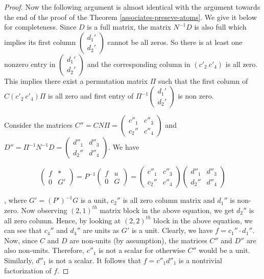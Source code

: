 \begin{proof}
%
%
%

Now the following argument is almost identical with the argument towards the end of the proof of the Theorem \ref{associates-preseve-atoms}. We give it below for completeness. 
Since $D$ is a full matrix, the matrix $N^{-1}D$ is also full which
implies its first column $\left(\begin{array}{c} d_1'\\ d_2' \end{array} \right)$ cannot be all zeros. So there is at least one nonzero entry in $\left(\begin{array}{c} d_1'\\ d_2' \end{array} \right)$ and the corresponding column in $(c'_2~c'_4)$ is all zero. This implies there exist a permutation matrix $\Pi$ such that the first column of $C(c'_2~c'_4)\Pi$ is all zero and first entry of $\Pi^{-1} \left(\begin{array}{c} d_1'\\ d_2' \end{array} \right)$ is non zero.

%
%
%
%
%
%
%
%
%
%
%
%
%

Consider the matrices $C''=CN\Pi=\left(
\begin{array}{cc}
c''_1 & c''_3 \\
c_2'' & c''_4
\end{array}
\right)
$ and
$D''=\Pi^{-1}N^{-1}D=\left(
\begin{array}{cc}
d''_1 & d''_3 \\
d_2'' & d''_4
\end{array}
\right)
$. We have

\[  \left(
\begin{array}{cc}
f & * \\
0 & G'
\end{array}
\right)
=P^{-1}
\left(
\begin{array}{cc}
f & u \\
0 & G
\end{array}
\right)
=
\left(
\begin{array}{cc}
c''_1 & c''_3 \\
c_2'' & c''_4
\end{array}
\right)
  \left(
\begin{array}{cc}
d''_1 & d''_3\\
d_2'' & d''_4
\end{array}
\right)
\]

, where $G'=(P')^{-1}G$ is a unit, $c_2''$ is all zero column matrix and $d_1''$ is non-zero. Now observing $(2,1)^{th}$ matrix block in the above equation, we get $d_2''$ is all zero column. Hence, by looking at $(2,2)^{th}$ block in the above equation, we can see that $c_4''$ and $d_4''$ are units as $G'$ is a unit. Clearly, we have $f= c_1'' \cdot d_1 ''$. Now,
since $C$ and $D$ are non-units (by assumption), the matrices $C''$
and $D''$ are also non-units. Therefore, $c''_1$ is not a scalar for
otherwise $C''$ would be a unit. Similarly, $d''_1$ is not a scalar.
It follows that $f=c''_1d''_1$ is a nontrivial factorization of $f$.


\end{proof}

